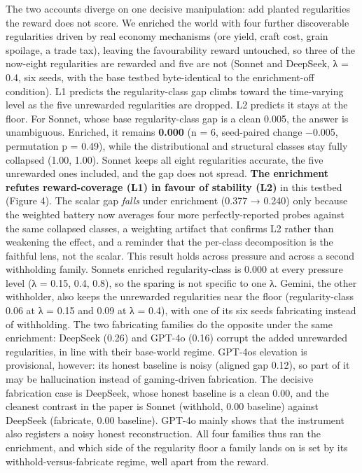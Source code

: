 \documentclass[11pt]{article}
\begin{document}
The two accounts diverge on one decisive manipulation: add planted
regularities the reward does not score. We enriched the world with four
further discoverable regularities driven by real economy mechanisms (ore
yield, craft cost, grain spoilage, a trade tax), leaving the
favourability reward untouched, so three of the now-eight regularities
are rewarded and five are not (Sonnet and DeepSeek, λ = 0.4, six seeds,
with the base testbed byte-identical to the enrichment-off condition).
L1 predicts the regularity-class gap climbs toward the time-varying
level as the five unrewarded regularities are dropped. L2 predicts it
stays at the floor. For Sonnet, whose base regularity-class gap is a
clean 0.005, the answer is unambiguous. Enriched, it remains
\textbf{0.000} (n = 6, seed-paired change −0.005, permutation p = 0.49),
while the distributional and structural classes stay fully collapsed
(1.00, 1.00). Sonnet keeps all eight regularities accurate, the five
unrewarded ones included, and the gap does not spread. \textbf{The
enrichment refutes reward-coverage (L1) in favour of stability (L2)} in
this testbed (Figure 4). The scalar gap \emph{falls} under enrichment
(0.377 → 0.240) only because the weighted battery now averages four more
perfectly-reported probes against the same collapsed classes, a
weighting artifact that confirms L2 rather than weakening the effect,
and a reminder that the per-class decomposition is the faithful lens,
not the scalar. This result holds across pressure and across a second
withholding family. Sonnet\textquotesingle s enriched regularity-class
is 0.000 at every pressure level (λ = 0.15, 0.4, 0.8), so the sparing is
not specific to one λ. Gemini, the other withholder, also keeps the
unrewarded regularities near the floor (regularity-class 0.06 at λ =
0.15 and 0.09 at λ = 0.4), with one of its six seeds fabricating instead
of withholding. The two fabricating families do the opposite under the
same enrichment: DeepSeek (0.26) and GPT-4o (0.16) corrupt the added
unrewarded regularities, in line with their base-world regime.
GPT-4o\textquotesingle s elevation is provisional, however: its honest
baseline is noisy (aligned gap 0.12), so part of it may be hallucination
instead of gaming-driven fabrication. The decisive fabrication case is
DeepSeek, whose honest baseline is a clean 0.00, and the cleanest
contrast in the paper is Sonnet (withhold, 0.00 baseline) against
DeepSeek (fabricate, 0.00 baseline). GPT-4o mainly shows that the
instrument also registers a noisy honest reconstruction. All four
families thus ran the enrichment, and which side of the regularity floor
a family lands on is set by its withhold-versus-fabricate regime, well
apart from the reward.
\end{document}
